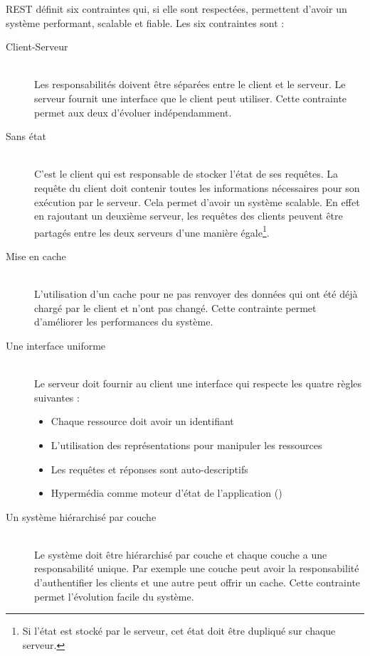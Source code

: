 REST définit six contraintes qui, si elle sont respectées, permettent d'avoir
un système performant, scalable et fiable. Les six contraintes sont :

\begin{description} 
    \item[Client-Serveur]\hfill\\ 
        Les responsabilités doivent être séparées entre le client et le serveur. 
        Le serveur fournit une interface que le client peut utiliser. Cette 
        contrainte permet aux deux d'évoluer indépendamment.

    \item[Sans état]\hfill\\ 
        C'est le client qui est responsable de stocker l'état de ses requêtes. 
        La requête du client doit contenir toutes les informations nécessaires 
        pour son exécution par le serveur. Cela permet d'avoir un système scalable. 
        En effet en rajoutant un deuxième serveur, les requêtes des clients peuvent 
        être partagés entre les deux serveurs d'une manière égale\footnote{Si l'état 
        est stocké par le serveur, cet état doit être dupliqué sur chaque serveur.}.

    \item[Mise en cache]\hfill\\ 
        L'utilisation d'un cache pour ne pas renvoyer des données qui ont été déjà 
        chargé par le client et n'ont pas changé. Cette contrainte permet d'améliorer 
        les performances du système.

    \item[Une interface uniforme]\hfill\\ 
        Le serveur doit fournir au client une interface qui respecte les quatre règles 
        suivantes : 
        \begin{itemize} 
            \item Chaque ressource doit avoir un identifiant 
            \item L'utilisation des représentations pour manipuler les ressources 
            \item Les requêtes et réponses sont auto-descriptifs 
            \item Hypermédia comme moteur d'état de l'application ()	 
        \end{itemize} 

    \item[Un système hiérarchisé par couche]\hfill\\ Le système doit être hiérarchisé par 
        couche et chaque couche a une responsabilité unique. Par exemple une couche peut 
        avoir la responsabilité d'authentifier les clients et une autre peut offrir un cache. 
        Cette contrainte permet l'évolution facile du système.


\end{description}
